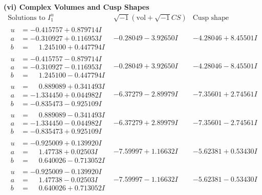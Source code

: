 \documentclass[1p]{elsarticle_modified}
\theoremstyle{definition}
\newcommand{\I}{\sqrt{-1}}
\begin{document}
\newpage\flushleft \textbf{(vi) Complex Volumes and Cusp Shapes}
$$\begin{array}{c|c|c}  
\text{Solutions to }I^u_{1}& \I (\text{vol} + \sqrt{-1}CS) & \text{Cusp shape}\\
 \hline 
\begin{aligned}
u &= -0.415757 + 0.879714 I \\
a &= -0.310927 + 0.116953 I \\
b &= \phantom{-}1.245100 + 0.447794 I\end{aligned}
 & -0.28049 - 3.92650 I & -4.28046 + 8.45501 I \\ \hline\begin{aligned}
u &= -0.415757 - 0.879714 I \\
a &= -0.310927 - 0.116953 I \\
b &= \phantom{-}1.245100 - 0.447794 I\end{aligned}
 & -0.28049 + 3.92650 I & -4.28046 - 8.45501 I \\ \hline\begin{aligned}
u &= \phantom{-}0.889089 + 0.341493 I \\
a &= -1.334450 + 0.044982 I \\
b &= -0.835473 - 0.925109 I\end{aligned}
 & -6.37279 - 2.89979 I & -7.35601 + 2.74561 I \\ \hline\begin{aligned}
u &= \phantom{-}0.889089 - 0.341493 I \\
a &= -1.334450 - 0.044982 I \\
b &= -0.835473 + 0.925109 I\end{aligned}
 & -6.37279 + 2.89979 I & -7.35601 - 2.74561 I \\ \hline\begin{aligned}
u &= -0.925009 + 0.139920 I \\
a &= \phantom{-}1.47738 + 0.02503 I \\
b &= \phantom{-}0.640026 - 0.713052 I\end{aligned}
 & -7.59997 + 1.16632 I & -5.62381 + 0.53430 I \\ \hline\begin{aligned}
u &= -0.925009 - 0.139920 I \\
a &= \phantom{-}1.47738 - 0.02503 I \\
b &= \phantom{-}0.640026 + 0.713052 I\end{aligned}
 & -7.59997 - 1.16632 I & -5.62381 - 0.53430 I \\ \hline\begin{aligned}

\end{aligned}
\end{array}$$
\end{document}
